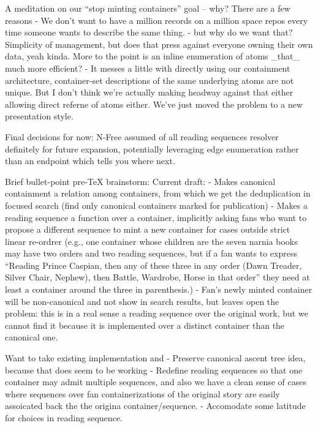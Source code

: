 A meditation on our ``stop minting containers'' goal -- why? There are a few reasons
 - We don't want to have a million records on a million space repos every time someone wants to describe the same thing.
   - but why do we want that? Simplicity of management, but does that press against everyone owning their own data, yeah kinda. More to the point is an inline enumeration of atoms _that_ much more efficient? 
 - It messes a little with directly using our containment architecture, container-set descriptions of the same underlying atoms are not unique. But I don't think we're actually making headway against that either allowing direct referne of atoms either. We've just moved the problem to a new presentation style.  



Final decisions for now:
N-Free assumed of all reading sequences
resolver definitely for future expansion, potentially leveraging edge enumeration rather than an endpoint which tells you where next.

Brief bullet-point pre-TeX brainstorm:
Current draft: 
- Makes canonical containment a relation among containers, from which we get the deduplication in focused search (find only canonical containers marked for publication)
- Makes a reading sequence a function over a container, implicitly asking fans who want to propose a different sequence to mint a new container for cases outside strict linear re-ordrer (e.g., one container whose children are the seven narnia books may have two orders and two reading sequences, but if a fan wants to express ``Reading Prince Caspian, then any of these three in any order (Dawn Treader, Silver Chair, Nephew), then Battle, Wardrobe, Horse in that order'' they need at least a container around the three in parenthesis.)
- Fan's newly minted container will be non-canonical and not show in search results, but leaves open the problem: this is in a real sense a reading sequence over the original work, but we cannot find it because it is implemented over a distinct container than the canonical one.

Want to take existing implementation and 
- Preserve canonical ascent tree idea, because that does seem to be working
- Redefine reading sequences so that one container may admit multiple sequences, and also we have a clean sense of cases where sequences over fan containerizations of the original story are easily assoicated back the the origina container/sequence. 
- Accomodate some latitude for choices in reading sequence. 

